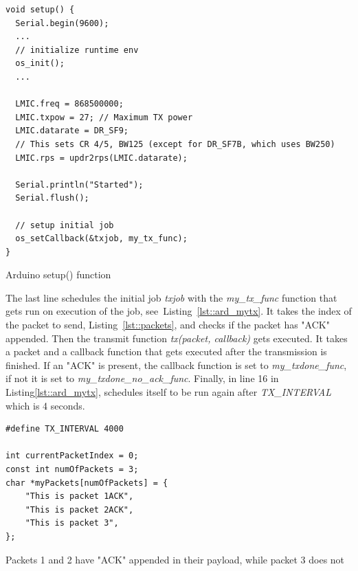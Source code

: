 \begin{listing}[h]
    \begin{verbatim}
void setup() {
  Serial.begin(9600);
  ...
  // initialize runtime env
  os_init();
  ...
  
  LMIC.freq = 868500000;
  LMIC.txpow = 27; // Maximum TX power
  LMIC.datarate = DR_SF9;
  // This sets CR 4/5, BW125 (except for DR_SF7B, which uses BW250)
  LMIC.rps = updr2rps(LMIC.datarate);

  Serial.println("Started");
  Serial.flush();

  // setup initial job
  os_setCallback(&txjob, my_tx_func);
}
    \end{verbatim}
    \caption{Arduino setup() function}
    \label{lst::ard_setup}
    
\end{listing}

The last line schedules the initial job \emph{txjob} with the \emph{my\_tx\_func} function that gets run
on execution of the job, see~Listing~\ref{lst::ard_mytx}. It takes the index of the packet to send, Listing~\ref{lst::packets}, and
checks if the packet has "ACK" appended. Then the transmit function \emph{tx(packet, callback)} gets executed. 
It takes a packet and a callback function that gets executed after the transmission is finished. 
If an "ACK" is present, the callback function is set to \emph{my\_txdone\_func}, if not it is set to \emph{my\_txdone\_no\_ack\_func}.
Finally, in line 16 in Listing\ref{lst::ard_mytx}, schedules itself to be run again after \emph{TX\_INTERVAL} which is 4 seconds.


\begin{listing}[h]
    \begin{verbatim}
#define TX_INTERVAL 4000

int currentPacketIndex = 0;
const int numOfPackets = 3;
char *myPackets[numOfPackets] = {
    "This is packet 1ACK", 
    "This is packet 2ACK", 
    "This is packet 3",
};
    \end{verbatim}
    \caption{Packets 1 and 2 have "ACK" appended in their payload, while packet 3 does not}
    \label{lst::packets}
    
\end{listing}


